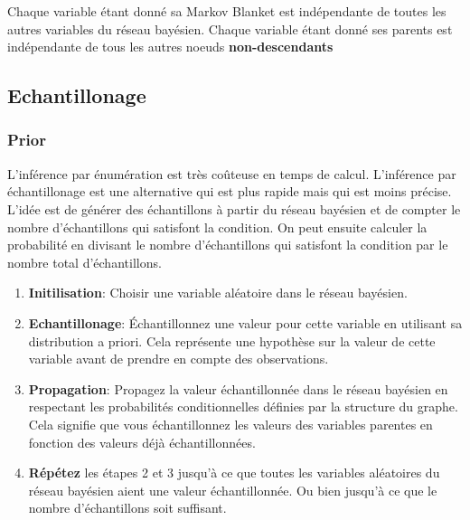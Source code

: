 Chaque variable étant donné sa Markov Blanket est indépendante de toutes les autres variables du réseau bayésien.
Chaque variable étant donné ses parents est indépendante de tous les autres noeuds \textbf{non-descendants}


\subsection{Echantillonage} %
\label{sub:echantillonage}

\subsubsection{Prior} %
\label{sec:prior}

\begin{remark}\leavevmode
    L'inférence par énumération est très coûteuse en temps de calcul.
    L'inférence par échantillonage est une alternative qui est plus rapide mais qui est moins précise.
    L'idée est de générer des échantillons à partir du réseau bayésien et de compter le nombre d'échantillons qui satisfont la condition.
    On peut ensuite calculer la probabilité en divisant le nombre d'échantillons qui satisfont la condition par le nombre total d'échantillons. 
\end{remark}

\begin{enumerate}
    \item \textbf{Initilisation}: Choisir une variable aléatoire dans le réseau bayésien.
    \item \textbf{Echantillonage}: Échantillonnez une valeur pour cette variable en utilisant sa distribution a priori. 
        Cela représente une hypothèse sur la valeur de cette variable avant de prendre en compte des observations.
    \item \textbf{Propagation}: Propagez la valeur échantillonnée dans le réseau bayésien en 
        respectant les probabilités conditionnelles définies par la structure du graphe. 
        Cela signifie que vous échantillonnez les valeurs des variables parentes en fonction des valeurs déjà échantillonnées.
    \item \textbf{Répétez} les étapes 2 et 3 jusqu'à ce que toutes les variables aléatoires du réseau bayésien aient une valeur échantillonnée. Ou bien jusqu'à ce que le nombre d'échantillons soit suffisant.
\end{enumerate}

